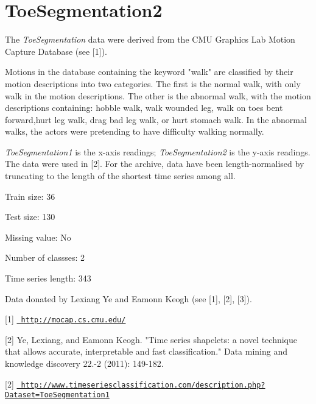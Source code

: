 \chapter{Toe\+Segmentation2}
\hypertarget{md_external_2data_2UCRArchive__2018_2ToeSegmentation2_2README}{}\label{md_external_2data_2UCRArchive__2018_2ToeSegmentation2_2README}
\label{md_external_2data_2UCRArchive__2018_2ToeSegmentation2_2README_autotoc_md220}%
%
 The {\itshape Toe\+Segmentation} data were derived from the CMU Graphics Lab Motion Capture Database (see \mbox{[}1\mbox{]}).

Motions in the database containing the keyword "{}walk"{} are classified by their motion descriptions into two categories. The first is the normal walk, with only walk in the motion descriptions. The other is the abnormal walk, with the motion descriptions containing\+: hobble walk, walk wounded leg, walk on toes bent forward,hurt leg walk, drag bad leg walk, or hurt stomach walk. In the abnormal walks, the actors were pretending to have difficulty walking normally.

{\itshape Toe\+Segmentation1} is the x-\/axis readings; {\itshape Toe\+Segmentation2} is the y-\/axis readings. The data were used in \mbox{[}2\mbox{]}. For the archive, data have been length-\/normalised by truncating to the length of the shortest time series among all.

Train size\+: 36

Test size\+: 130

Missing value\+: No

Number of classses\+: 2

Time series length\+: 343

Data donated by Lexiang Ye and Eamonn Keogh (see \mbox{[}1\mbox{]}, \mbox{[}2\mbox{]}, \mbox{[}3\mbox{]}).

\mbox{[}1\mbox{]} \href{http://mocap.cs.cmu.edu/}{\texttt{ http\+://mocap.\+cs.\+cmu.\+edu/}} ~\newline


\mbox{[}2\mbox{]} Ye, Lexiang, and Eamonn Keogh. "{}\+Time series shapelets\+: a novel technique that allows accurate, interpretable and fast classification."{} Data mining and knowledge discovery 22.-\/2 (2011)\+: 149-\/182.

\mbox{[}2\mbox{]} \href{http://www.timeseriesclassification.com/description.php?Dataset=ToeSegmentation1}{\texttt{ http\+://www.\+timeseriesclassification.\+com/description.\+php?\+Dataset=\+Toe\+Segmentation1}} 